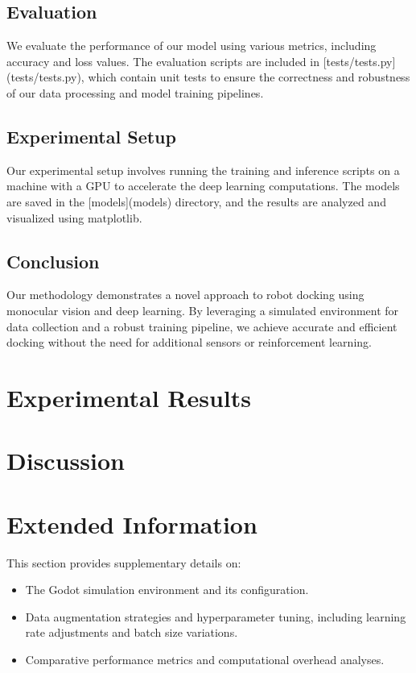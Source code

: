 \documentclass[twocolumn]{article}
\begin{document}
\subsection{Evaluation}
We evaluate the performance of our model using various metrics, including accuracy and loss values. The evaluation scripts are included in [tests/tests.py](tests/tests.py), which contain unit tests to ensure the correctness and robustness of our data processing and model training pipelines.

\subsection{Experimental Setup}
Our experimental setup involves running the training and inference scripts on a machine with a GPU to accelerate the deep learning computations. The models are saved in the [models](models) directory, and the results are analyzed and visualized using matplotlib.

\subsection{Conclusion}
Our methodology demonstrates a novel approach to robot docking using monocular vision and deep learning. By leveraging a simulated environment for data collection and a robust training pipeline, we achieve accurate and efficient docking without the need for additional sensors or reinforcement learning.

\section{Experimental Results}

\section{Discussion}

\section{Extended Information}
This section provides supplementary details on:
\begin{itemize}
	\item The Godot simulation environment and its configuration.
	\item Data augmentation strategies and hyperparameter tuning, including learning rate adjustments and batch size variations.
	\item Comparative performance metrics and computational overhead analyses.
\end{itemize}
\end{document}
